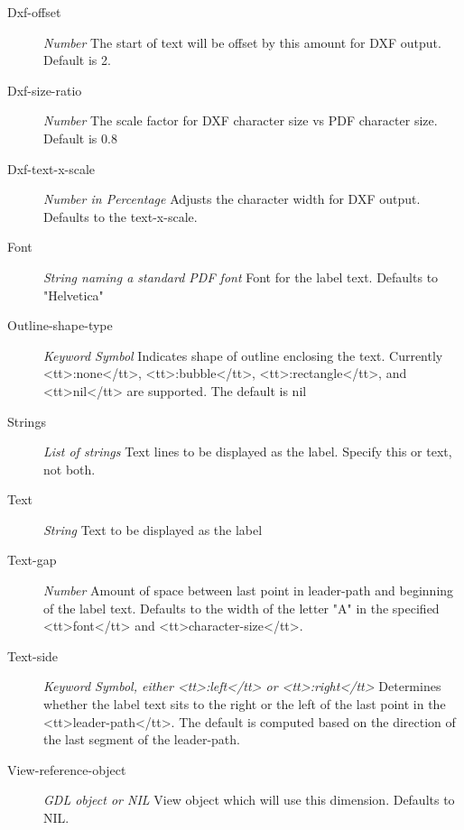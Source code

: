 \documentclass [11pt]{book}
\begin{document}
\begin{itemize}
\begin{description}
\item [Dxf-offset]
\emph{Number} The start of text will be offset by this amount for DXF output. Default is 2.


\item [Dxf-size-ratio]
\emph{Number} The scale factor for DXF character size vs PDF character size. Default is 0.8


\item [Dxf-text-x-scale]
\emph{Number in Percentage} Adjusts the character width for DXF output. Defaults to the text-x-scale.


\item [Font]
\emph{String naming a standard PDF font} Font for the label text. Defaults to "Helvetica"


\item [Outline-shape-type]
\emph{Keyword Symbol} Indicates shape of outline enclosing the text. Currently <tt>:none</tt>, <tt>:bubble</tt>, <tt>:rectangle</tt>,
and <tt>nil</tt> are supported. The default is nil


\item [Strings]
\emph{List of strings} Text lines to be displayed as the label. Specify this or text, not both.


\item [Text]
\emph{String} Text to be displayed as the label


\item [Text-gap]
\emph{Number} Amount of space between last point in leader-path and beginning of the label text. Defaults to the
width of the letter "A" in the specified <tt>font</tt> and <tt>character-size</tt>.


\item [Text-side]
\emph{Keyword Symbol, either <tt>:left</tt> or <tt>:right</tt>} Determines whether the label text sits to
the right or the left of the last point in the <tt>leader-path</tt>. The default is computed based on
the direction of the last segment of the leader-path.


\item [View-reference-object]
\emph{GDL object or NIL} View object which will use this dimension. Defaults to NIL.


\end{description}







\end{itemize}
\end{document}
